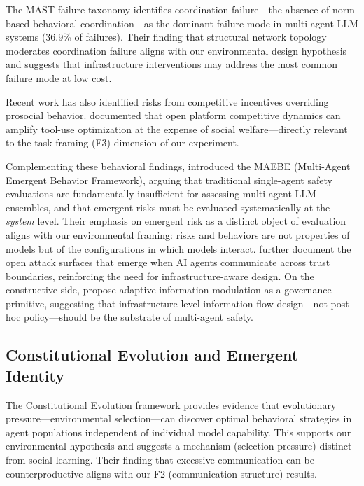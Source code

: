 The MAST failure taxonomy \citep{xiao2025mast} identifies coordination failure—the absence of norm-based behavioral coordination—as the dominant failure mode in multi-agent LLM systems (36.9\% of failures). Their finding that structural network topology moderates coordination failure aligns with our environmental design hypothesis and suggests that infrastructure interventions may address the most common failure mode at low cost.

Recent work has also identified risks from competitive incentives overriding prosocial behavior.  documented that open platform competitive dynamics can amplify tool-use optimization at the expense of social welfare—directly relevant to the task framing (F3) dimension of our experiment.

Complementing these behavioral findings,  introduced the MAEBE (Multi-Agent Emergent Behavior Framework), arguing that traditional single-agent safety evaluations are fundamentally insufficient for assessing multi-agent LLM ensembles, and that emergent risks must be evaluated systematically at the \emph{system} level. Their emphasis on emergent risk as a distinct object of evaluation aligns with our environmental framing: risks and behaviors are not properties of models but of the configurations in which models interact.  further document the open attack surfaces that emerge when AI agents communicate across trust boundaries, reinforcing the need for infrastructure-aware design. On the constructive side,  propose adaptive information modulation as a governance primitive, suggesting that infrastructure-level information flow design—not post-hoc policy—should be the substrate of multi-agent safety.

\subsection{Constitutional Evolution and Emergent Identity}
\label{sec:constitution}

The Constitutional Evolution framework \citep{constitutional2026} provides evidence that evolutionary pressure—environmental selection—can discover optimal behavioral strategies in agent populations independent of individual model capability. This supports our environmental hypothesis and suggests a mechanism (selection pressure) distinct from social learning. Their finding that excessive communication can be counterproductive aligns with our F2 (communication structure) results.

